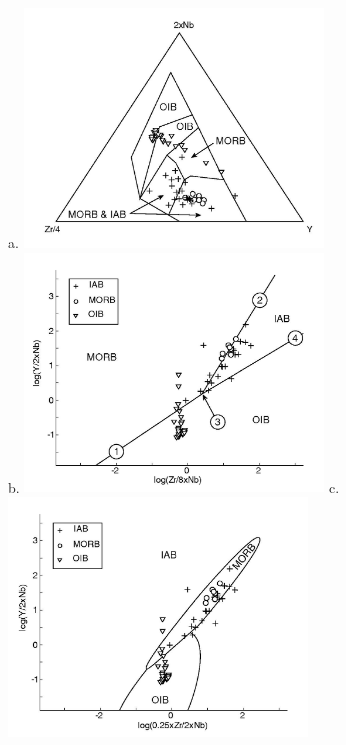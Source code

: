 \begin{figure}[htbp]
  \centering
a.  \includegraphics[width=300]{figures/Meschede.jpg}\\
b.  \includegraphics[width=300]{figures/log_Nb_Zr_Y_lin.jpg}
c.  \includegraphics[width=300]{figures/log_Nb_Zr_Y_q.jpg}

\end{figure}
